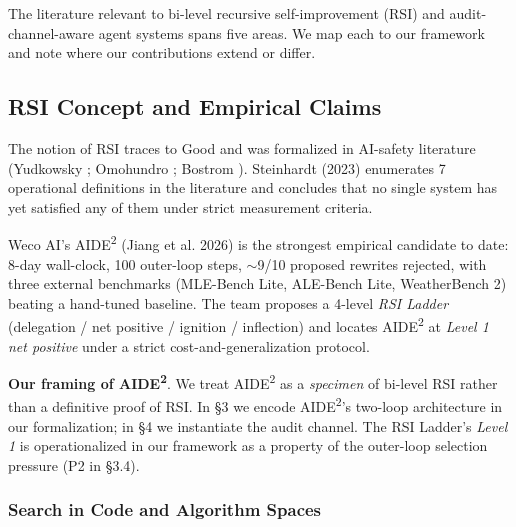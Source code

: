 
The literature relevant to bi-level recursive self-improvement (RSI) and audit-channel-aware agent systems spans five areas. We map each to our framework and note where our contributions extend or differ.

\subsection{RSI Concept and Empirical Claims}

The notion of RSI traces to Good \cite{good1965speculations} and was formalized in AI-safety literature (Yudkowsky \cite{yudkowsky2008artificial}; Omohundro \cite{omohundro2008basic}; Bostrom \cite{bostrom2014superintelligence}). Steinhardt \cite{steinhardt2023secret} (2023) enumerates 7 operational definitions in the literature and concludes that no single system has yet satisfied any of them under strict measurement criteria.

Weco AI's AIDE\textsuperscript{2} (Jiang et al. 2026) is the strongest empirical candidate to date: 8-day wall-clock, 100 outer-loop steps, $\sim$9/10 proposed rewrites rejected, with three external benchmarks (MLE-Bench Lite, ALE-Bench Lite, WeatherBench 2) beating a hand-tuned baseline. The team proposes a 4-level \emph{RSI Ladder} (delegation / net positive / ignition / inflection) and locates AIDE\textsuperscript{2} at \emph{Level 1 net positive} under a strict cost-and-generalization protocol.

\textbf{Our framing of AIDE\textsuperscript{2}}. We treat AIDE\textsuperscript{2} as a \emph{specimen} of bi-level RSI rather than a definitive proof of RSI. In \S3 we encode AIDE\textsuperscript{2}'s two-loop architecture in our formalization; in \S4 we instantiate the audit channel. The RSI Ladder's \emph{Level 1} is operationalized in our framework as a property of the outer-loop selection pressure (P2 in \S3.4).

\subsubsection{Search in Code and Algorithm Spaces}

